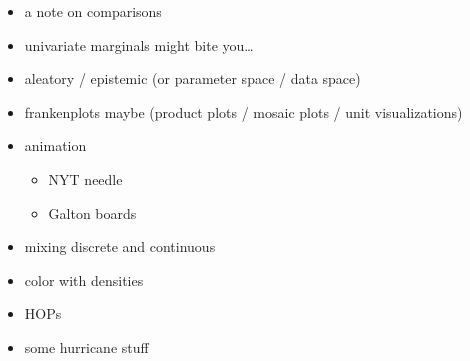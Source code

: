 \documentclass[]{book}
\providecommand{\tightlist}{%
  \setlength{\itemsep}{0pt}\setlength{\parskip}{0pt}}
\theoremstyle{definition}
\theoremstyle{definition}
\theoremstyle{definition}
\theoremstyle{remark}
\begin{document}
\begin{itemize}
\tightlist
\item
  a note on comparisons
\item
  univariate marginals might bite you\ldots{}
\item
  aleatory / epistemic (or parameter space / data space)
\item
  frankenplots maybe (product plots / mosaic plots / unit
  visualizations)
\item
  animation

  \begin{itemize}
  \tightlist
  \item
    NYT needle
  \item
    Galton boards
  \end{itemize}
\item
  mixing discrete and continuous
\item
  color with densities
\item
  HOPs
\item
  some hurricane stuff
\end{itemize}


\end{document}

